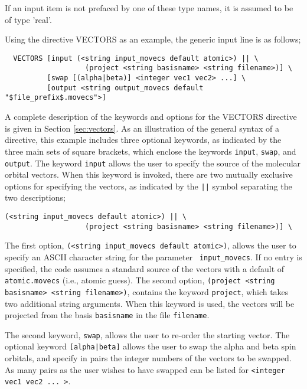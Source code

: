 If an input item is not prefaced by one of these type names,
it is assumed to be of type 'real'.
 
Using the directive VECTORS  as an example, 
the generic input line is as follows;
\begin{verbatim}
  VECTORS [input (<string input_movecs default atomic>) || \
                   (project <string basisname> <string filename>)] \
          [swap [(alpha|beta)] <integer vec1 vec2> ...] \
          [output <string output_movecs default "$file_prefix$.movecs">]
\end{verbatim}

A complete description of the keywords
and options for the VECTORS directive is given in Section \ref{sec:vectors}.
As an illustration of the general syntax of a directive, this example includes
three optional keywords, as indicated by
the three main sets of square brackets, which enclose the keywords \verb+input+,
\verb+swap+, and \verb+output+.  The keyword \verb+input+ allows the user
to specify the source of the molecular orbital vectors.  When this keyword
is invoked, there are two mutually exclusive options for specifying the
vectors, as indicated by the \verb+||+ symbol separating the two descriptions;

\begin{verbatim}
(<string input_movecs default atomic>) || \
                   (project <string basisname> <string filename>)] \

\end{verbatim}

The first option, \verb+(<string input_movecs default atomic>)+, allows
the user to specify an ASCII character string for the parameter {\tt 
input\_movecs}.
If no entry is specified, the code assumes a
standard source of the vectors with a default of \verb+atomic.movecs+ 
(i.e., atomic guess).  The second option, 
\verb+(project <string basisname> <string filename>)+, contains the
keyword \verb+project+, which takes two additional string arguments.
When this keyword is used, the vectors will be projected from the basis
\verb+basisname+ in the file \verb+filename+.

The second keyword, \verb+swap+, allows the user to re-order the starting
vector.  The optional keyword \verb+[alpha|beta]+ allows the user to swap
the alpha and beta spin orbitals, and specify in pairs the integer numbers
of the vectors to be swapped.  As many pairs as the user wishes to have
swapped can be listed for \verb+<integer vec1 vec2 ... >+.

